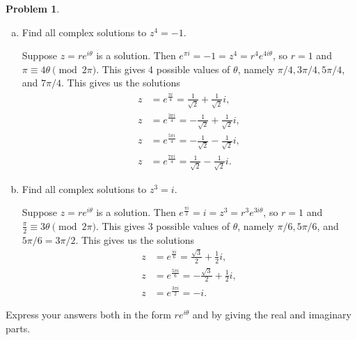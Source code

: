 \documentclass[11pt,oneside]{amsart}
\theoremstyle{definition}
\newtheorem{problem}{Problem}
\begin{document}
    \begin{problem}\hfill
        \begin{enumerate}[(a)]
            \item Find all complex solutions to $z^4=-1$.
            \begin{solution}
                Suppose $z=re^{i\theta}$ is a solution. Then $e^{\pi i}=-1=z^4=r^4e^{4i\theta}$, so $r=1$ and $\pi\equiv 4\theta\pmod{2\pi}$. This gives 4 possible values of $\theta$, namely $\pi/4,3\pi/4,5\pi/4$, and $7\pi/4$. This gives us the solutions
                \begin{align*}
                    z &= e^{\frac{\pi i}4}=\frac 1{\sqrt2}+\frac 1{\sqrt2}i,\\
                    z &= e^{\frac{3\pi i}4}=-\frac1{\sqrt2}+\frac 1{\sqrt2}i,\\
                    z &= e^{\frac{5\pi i}4} = -\frac1{\sqrt2}-\frac1{\sqrt2}i,\\
                    z &= e^{\frac{7\pi i}4} = \frac1{\sqrt2}-\frac1{\sqrt2}i.
                \end{align*} 
            \end{solution}
            \item Find all complex solutions to $z^3=i$.
            \begin{solution}
                Suppose $z=re^{i\theta}$ is a solution. Then $e^{\frac{\pi i}2}=i=z^3=r^3e^{3i\theta}$, so $r=1$ and $\frac\pi2\equiv 3\theta\pmod{2\pi}$. This gives 3 possible values of $\theta$, namely $\pi/6,5\pi/6$, and $5\pi/6=3\pi/2$. This gives us the solutions
                \begin{align*}
                    z &= e^{\frac{\pi i}6}=\frac{\sqrt3}2+\frac12i,\\
                    z &= e^{\frac{5\pi i}6} = -\frac{\sqrt3}2+\frac12i,\\
                    z &= e^{\frac{3\pi i}2}=-i.
                \end{align*} 
            \end{solution}
        \end{enumerate}
        Express your answers both in the form $re^{i\theta}$ and by giving the real and imaginary parts.
    \end{problem}
\end{document}
